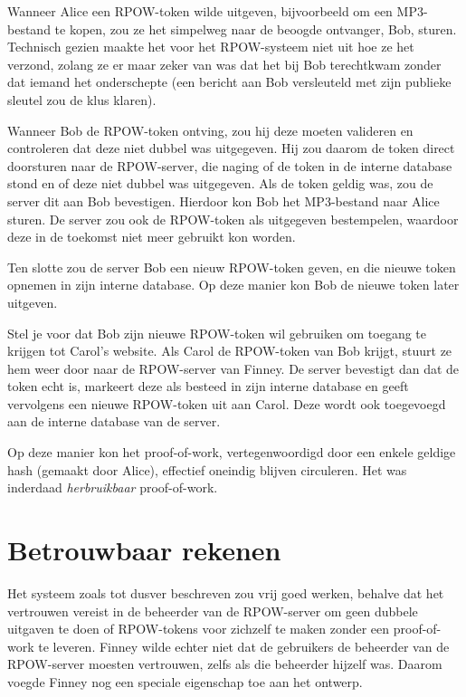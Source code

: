 \documentclass[
  a5paper,
  smalldemyvopaper,11pt,twoside,onecolumn,openright,extrafontsizes]{memoir}
\begin{document}
Wanneer Alice een RPOW-token wilde uitgeven, bijvoorbeeld om een
MP3-bestand te kopen, zou ze het simpelweg naar de beoogde ontvanger,
Bob, sturen. Technisch gezien maakte het voor het RPOW-systeem niet uit
hoe ze het verzond, zolang ze er maar zeker van was dat het bij Bob
terechtkwam zonder dat iemand het onderschepte (een bericht aan Bob
versleuteld met zijn publieke sleutel zou de klus klaren).

Wanneer Bob de RPOW-token ontving, zou hij deze moeten valideren en
controleren dat deze niet dubbel was uitgegeven. Hij zou daarom de token
direct doorsturen naar de RPOW-server, die naging of de token in de
interne database stond en of deze niet dubbel was uitgegeven. Als de
token geldig was, zou de server dit aan Bob bevestigen. Hierdoor kon Bob
het MP3-bestand naar Alice sturen. De server zou ook de RPOW-token als
uitgegeven bestempelen, waardoor deze in de toekomst niet meer gebruikt
kon worden.

Ten slotte zou de server Bob een nieuw RPOW-token geven, en die nieuwe
token opnemen in zijn interne database. Op deze manier kon Bob de nieuwe
token later uitgeven.

Stel je voor dat Bob zijn nieuwe RPOW-token wil gebruiken om toegang te
krijgen tot Carol's website. Als Carol de RPOW-token van Bob krijgt,
stuurt ze hem weer door naar de RPOW-server van Finney. De server
bevestigt dan dat de token echt is, markeert deze als besteed in zijn
interne database en geeft vervolgens een nieuwe RPOW-token uit aan
Carol. Deze wordt ook toegevoegd aan de interne database van de server.

Op deze manier kon het proof-of-work, vertegenwoordigd door een enkele
geldige hash (gemaakt door Alice), effectief oneindig blijven
circuleren. Het was inderdaad \emph{herbruikbaar} proof-of-work.

\section{Betrouwbaar rekenen}\label{betrouwbaar-rekenen}

Het systeem zoals tot dusver beschreven zou vrij goed werken, behalve
dat het vertrouwen vereist in de beheerder van de RPOW-server om geen
dubbele uitgaven te doen of RPOW-tokens voor zichzelf te maken zonder
een proof-of-work te leveren. Finney wilde echter niet dat de gebruikers
de beheerder van de RPOW-server moesten vertrouwen, zelfs als die
beheerder hijzelf was. Daarom voegde Finney nog een speciale eigenschap
toe aan het ontwerp.
\end{document}
